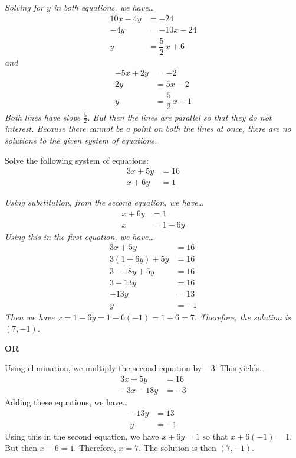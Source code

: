 \documentclass[12pt,letterpaper]{exam}
\begin{document}
\begin{questions}
{\itshape Solving for $y$ in both equations, we have\dots
	\[
	\begin{aligned}
	10x - 4y&= -24 \\[0.3cm]
	-4y&= -10x - 24 \\[0.3cm]
	y&= \dfrac{5}{2}\,x + 6
	\end{aligned}
	\] 
and
	\[
	\begin{aligned}
	-5x + 2y&= -2 \\[0.3cm]
	2y&= 5x - 2 \\[0.3cm]
	y&= \dfrac{5}{2}\,x - 1
	\end{aligned}
	\] \pspace
Both lines have slope $\frac{5}{2}$. But then the lines are parallel so that they do not interest. Because there cannot be a point on both the lines at once, there are no solutions to the given system of equations.
}



\newpage
\question[10] Solve the following system of equations:
	\[
	\begin{aligned}
	3x + 5y&= 16 \\[0.3cm]
	x + 6y&= 1
	\end{aligned}
	\] \pspace

{\itshape Using substitution, from the second equation, we have\dots
	\[
	\begin{aligned}
	x + 6y&= 1 \\[0.3cm]
	x&= 1 - 6y
	\end{aligned}
	\]
Using this in the first equation, we have\dots
	\[
	\begin{aligned}
	3x + 5y&= 16 \\[0.3cm]
	3(1 - 6y) + 5y&= 16 \\[0.3cm]
	3 - 18y + 5y&= 16 \\[0.3cm]
	3 - 13y&= 16 \\[0.3cm]
	-13y&= 13 \\[0.3cm]
	y&= -1
	\end{aligned}
	\]
Then we have $x= 1 - 6y= 1 - 6(-1)= 1 + 6= 7$. Therefore, the solution is $(7, -1)$. 

	\begin{center} {\bfseries OR} \end{center}

Using elimination, we multiply the second equation by $-3$. This yields\dots
	\[
	\begin{aligned}
	3x + 5y&= 16 \\[0.3cm]
	-3x - 18y&= -3 
	\end{aligned}
	\]
Adding these equations, we have\dots
	\[
	\begin{aligned}
	-13y&= 13 \\[0.3cm]
	y&= -1
	\end{aligned}
	\]
Using this in the second equation, we have $x + 6y= 1$ so that $x + 6(-1)= 1$. But then $x - 6= 1$. Therefore, $x= 7$. The solution is then $(7, -1)$. 
}




\end{questions}
\end{document}
